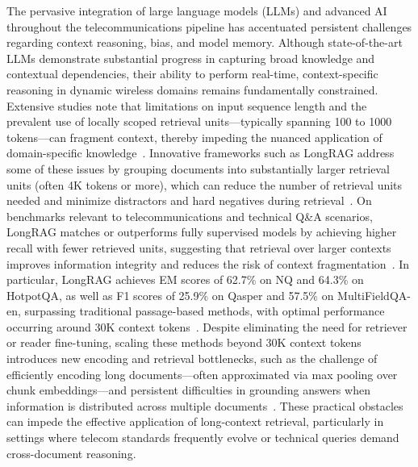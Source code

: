 \documentclass[sigconf]{acmart}
\begin{document}
The pervasive integration of large language models (LLMs) and advanced AI throughout the telecommunications pipeline has accentuated persistent challenges regarding context reasoning, bias, and model memory. Although state-of-the-art LLMs demonstrate substantial progress in capturing broad knowledge and contextual dependencies, their ability to perform real-time, context-specific reasoning in dynamic wireless domains remains fundamentally constrained. Extensive studies note that limitations on input sequence length and the prevalent use of locally scoped retrieval units—typically spanning 100 to 1000 tokens—can fragment context, thereby impeding the nuanced application of domain-specific knowledge~\cite{ref7,ref9,ref16,ref20,ref21,ref22,ref28,ref37}. Innovative frameworks such as LongRAG address some of these issues by grouping documents into substantially larger retrieval units (often 4K tokens or more), which can reduce the number of retrieval units needed and minimize distractors and hard negatives during retrieval~\cite{ref16}. On benchmarks relevant to telecommunications and technical Q\&A scenarios, LongRAG matches or outperforms fully supervised models by achieving higher recall with fewer retrieved units, suggesting that retrieval over larger contexts improves information integrity and reduces the risk of context fragmentation~\cite{ref16,ref20,ref21}. In particular, LongRAG achieves EM scores of 62.7\% on NQ and 64.3\% on HotpotQA, as well as F1 scores of 25.9\% on Qasper and 57.5\% on MultiFieldQA-en, surpassing traditional passage-based methods, with optimal performance occurring around 30K context tokens~\cite{ref16}. Despite eliminating the need for retriever or reader fine-tuning, scaling these methods beyond 30K context tokens introduces new encoding and retrieval bottlenecks, such as the challenge of efficiently encoding long documents—often approximated via max pooling over chunk embeddings—and persistent difficulties in grounding answers when information is distributed across multiple documents~\cite{ref16,ref20,ref22}. These practical obstacles can impede the effective application of long-context retrieval, particularly in settings where telecom standards frequently evolve or technical queries demand cross-document reasoning.
\end{document}
